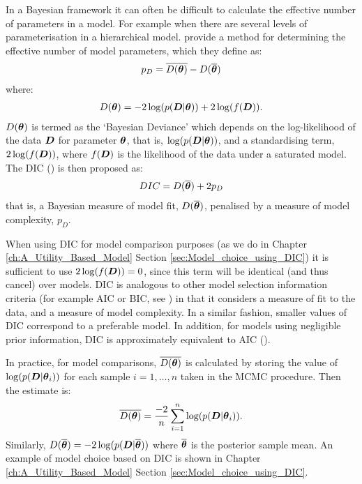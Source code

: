 In a Bayesian framework it can often be difficult to calculate the effective number of parameters in a model. For
example when there are several levels of parameterisation in a hierarchical model. \cite{spiegelhalter2002} provide a
method for determining the effective number of model parameters, which they define as:
\begin{align} 
p_D = \overline{D(\boldsymbol{\theta})} - D(\overline{\boldsymbol{\theta}})
\end{align}
where:
\begin{align}
D(\boldsymbol{\theta}) = -2 \log(p(\boldsymbol{D} | \boldsymbol{\theta})) + 2 \log(f(\boldsymbol{D})).
\end{align}
\(D(\boldsymbol{\theta})\) is termed as the `Bayesian Deviance' which depends on the log-likelihood of the data \(\boldsymbol{D}\) for
parameter \(\boldsymbol{\theta}\), that is, \(\log(p(\boldsymbol{D} | \boldsymbol{\theta}))\), and a standardising term, \(2 \log(f(\boldsymbol{D}))\),
where \(f(\boldsymbol{D})\) is the likelihood of the data under a saturated model. The \gls{DIC} (\cite{spiegelhalter2002}) is
then proposed as:
\begin{align} 
DIC = D(\overline{\boldsymbol{\theta}}) + 2 p_D
\end{align}
that is, a Bayesian measure of model fit, \(D(\overline{\boldsymbol{\theta}})\), penalised by a measure of model
complexity, \(p_D\).


When using \gls{DIC} for model comparison purposes (as we do in Chapter \ref{ch:A_Utility_Based_Model} Section
\ref{sec:Model_choice_using_DIC}) it is sufficient to use \(2 \log(f(\boldsymbol{D})) = 0\), since this term will be identical
(and thus cancel) over models. \gls{DIC} is analogous to other model selection information criteria (for example
\gls{AIC} or \gls{BIC}, see \cite{burnham2004}) in that it considers a measure of fit to the data, and a measure of
model complexity. In a similar fashion, smaller values of \gls{DIC} correspond to a preferable model. In addition, for
models using negligible prior information, \gls{DIC} is approximately equivalent to \gls{AIC}
(\cite{spiegelhalter2002}).

In practice, for model comparisons, \(\overline{D(\boldsymbol{\theta})}\) is calculated by storing the value of \(\log(p(\boldsymbol{D} |
\boldsymbol{\theta}_i))\) for each sample \(i = 1, \ldots, n\) taken in the \gls{MCMC} procedure. Then the estimate is:
\begin{align} 
\overline{D(\boldsymbol{\theta})} = \frac{-2}{n} \sum_{i=1}^{n} \log(p(\boldsymbol{D} | \boldsymbol{\theta}_i)).
\end{align}
Similarly, \(D(\overline{\boldsymbol{\theta}}) = -2 \log(p(\boldsymbol{D} | \overline{\boldsymbol{\theta}}))\) where \(\overline{\boldsymbol{\theta}}\) is
the posterior sample mean. An example of model choice based on \gls{DIC} is shown in Chapter
\ref{ch:A_Utility_Based_Model} Section \ref{sec:Model_choice_using_DIC}.

